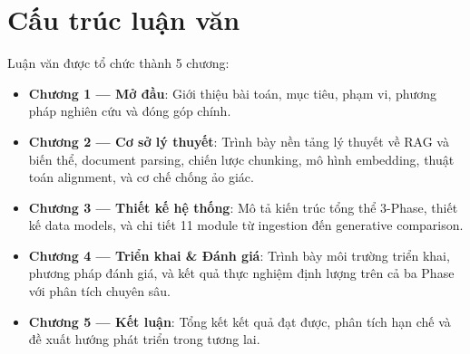 \section{Cấu trúc luận văn}

Luận văn được tổ chức thành 5 chương:

\begin{itemize}
    \item \textbf{Chương 1 — Mở đầu}: Giới thiệu bài toán, mục tiêu, phạm vi, phương pháp nghiên cứu và đóng góp chính.
    \item \textbf{Chương 2 — Cơ sở lý thuyết}: Trình bày nền tảng lý thuyết về RAG và biến thể, document parsing, chiến lược chunking, mô hình embedding, thuật toán alignment, và cơ chế chống ảo giác.
    \item \textbf{Chương 3 — Thiết kế hệ thống}: Mô tả kiến trúc tổng thể 3-Phase, thiết kế data models, và chi tiết 11 module từ ingestion đến generative comparison.
    \item \textbf{Chương 4 — Triển khai \& Đánh giá}: Trình bày môi trường triển khai, phương pháp đánh giá, và kết quả thực nghiệm định lượng trên cả ba Phase với phân tích chuyên sâu.
    \item \textbf{Chương 5 — Kết luận}: Tổng kết kết quả đạt được, phân tích hạn chế và đề xuất hướng phát triển trong tương lai.
\end{itemize}
